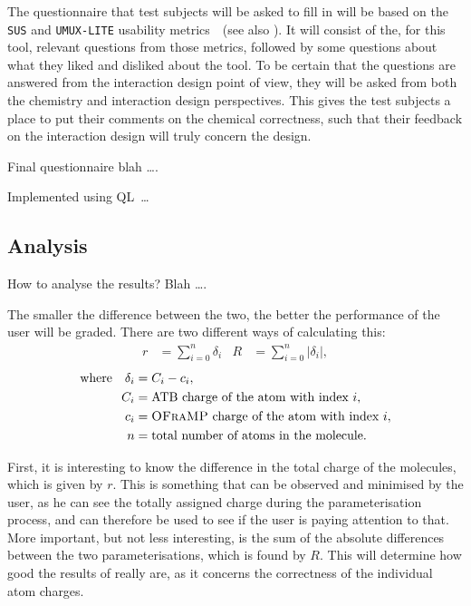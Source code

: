 The questionnaire that test subjects will be asked to fill in will be based on the \verb|SUS| and \verb|UMUX-LITE| usability metrics~\cite{lewis2013umux}~(see also ). It will consist of the, for this tool, relevant questions from those metrics, followed by some questions about what they liked and disliked about the tool. To be certain that the questions are answered from the interaction design point of view, they will be asked from both the chemistry and interaction design perspectives. This gives the test subjects a place to put their comments on the chemical correctness, such that their feedback on the interaction design will truly concern the design.

Final questionnaire blah \ldots.

Implemented using QL~\cite{erdweg2013state}\ldots

\subsection{Analysis}
How to analyse the results? Blah \ldots.

The smaller the difference between the two, the better the performance of the user will be graded. There are two different ways of calculating this:
\begin{align*}
r &= \sum_{i = 0}^{n} \delta_{i} & R &= \sum_{i = 0}^{n} |\delta_{i}|,
\end{align*}
\vspace{-1em}
\begin{align*}
\text{where} \quad \delta_{i} &= C_{i} - c_{i},\\
C_{i} &= \text{ATB charge of the atom with index}~i,\\
c_{i} &= \text{\textsc{OFraMP}{} charge of the atom with index}~i,\\
n &= \text{total number of atoms in the molecule}.
\end{align*}

First, it is interesting to know the difference in the total charge of the molecules, which is given by $r$. This is something that can be observed and minimised by the user, as he can see the totally assigned charge during the parameterisation process, and can therefore be used to see if the user is paying attention to that. More important, but not less interesting, is the sum of the absolute differences between the two parameterisations, which is found by $R$. This will determine how good the results of \oframp{} really are, as it concerns the correctness of the individual atom charges.

